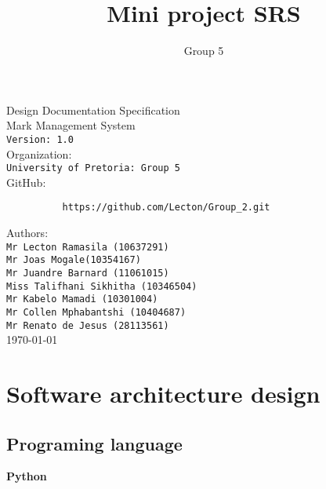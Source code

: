 \documentclass[10pt,a4paper]{article}
\author{Group 5}
\title{Mini project SRS}
\begin{document}
\begin{titlepage}
\begin{center}

\huge Design Documentation Specification\\[0.15cm]
\huge Mark Management System\\[0.15cm]
\large \texttt{Version: 1.0}\\[1cm]

Organization:\\
\texttt{University of Pretoria: Group 5}\\[0.5cm]
GitHub:\\[0.01cm]
\begin{verbatim}
          https://github.com/Lecton/Group_2.git
\end{verbatim}

Authors:\\
\texttt{Mr Lecton Ramasila (10637291)\\
        Mr Joas Mogale(10354167)\\
        Mr Juandre Barnard  (11061015)\\
        Miss Talifhani Sikhitha (10346504)\\
        Mr Kabelo Mamadi (10301004)\\
        Mr Collen Mphabantshi (10404687)\\
        Mr Renato de Jesus (28113561)}\\[1cm]
        
\today
\end{center}
\end{titlepage}


\tableofcontents
\pagebreak
\section{Software architecture design}

\subsection{Programing language}
\textbf{Python}
\end{document}
